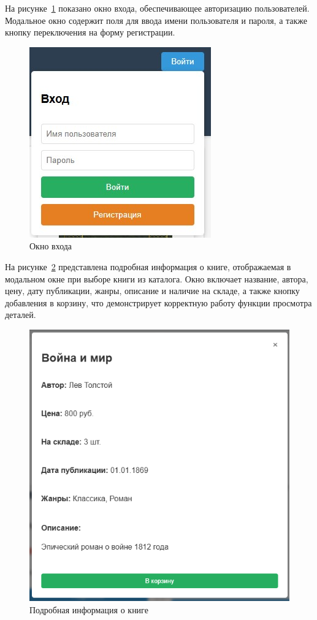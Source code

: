 На рисунке~\ref{fig:screenshot3} показано окно входа, обеспечивающее авторизацию пользователей. Модальное окно содержит поля для ввода имени пользователя и пароля, а также кнопку переключения на форму регистрации.
\begin{figure}[H]
	\centering
	\includegraphics[width=0.5\linewidth]{images/Screenshot_3}
	\caption{Окно входа}
	\label{fig:screenshot3}
\end{figure}

На рисунке~\ref{fig:book_details} представлена подробная информация о книге, отображаемая в модальном окне при выборе книги из каталога. Окно включает название, автора, цену, дату публикации, жанры, описание и наличие на складе, а также кнопку добавления в корзину, что демонстрирует корректную работу функции просмотра деталей.
\begin{figure}[H]
	\centering
	\includegraphics[width=0.7\linewidth]{images/подробнее}
	\caption{Подробная информация о книге}
	\label{fig:book_details}
\end{figure}

